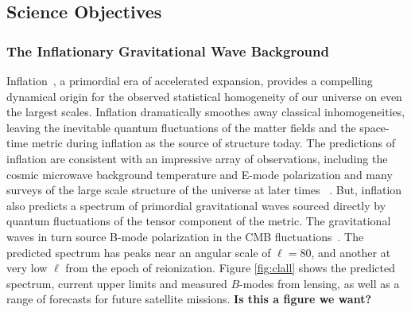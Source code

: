 
\subsection{Science Objectives}
\label{sec:science}

\vspace{-0.05in}


\subsubsection{The Inflationary Gravitational Wave Background}

\vspace{-0.05in}


Inflation~\cite{guth81,linde82,albrecht82,sato81,kolb94}, a primordial era of accelerated expansion, provides a compelling dynamical origin for the observed statistical homogeneity of our universe on even the largest scales. Inflation dramatically smoothes away classical inhomogeneities, leaving the inevitable quantum fluctuations of the matter fields and the space-time metric during inflation as the source of structure today.
The predictions of inflation are consistent with an impressive array of observations, including the cosmic microwave background temperature and E-mode polarization and many surveys of the large scale structure of the universe at later times ~\cite{spergel06,Tegmark:2006az,planck2015parameters,planck2015inflation}. But, inflation also predicts a spectrum of primordial gravitational waves sourced directly by quantum fluctuations of the tensor component of the metric. The gravitational waves in turn source B-mode polarization in the CMB fluctuations~\cite{kamionkowski97a,zaldarriaga97}. The predicted spectrum has peaks near an angular scale of $\ell=80$, and another at very low $\ell$ from the epoch of reionization. Figure \ref{fig:clall} shows the predicted spectrum, current upper limits and measured $B$-modes from lensing, as well as a range of forecasts for future satellite missions. {\bf Is this a figure we want?}

